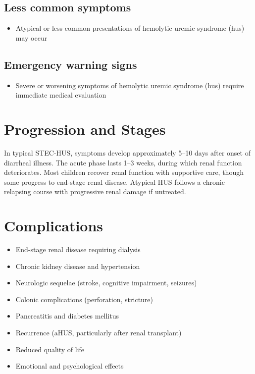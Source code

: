 \subsection{Less common symptoms}
\begin{itemize}[noitemsep]
  \item Atypical or less common presentations of hemolytic uremic syndrome (hus) may occur
\end{itemize}

\subsection{Emergency warning signs}
\begin{itemize}[noitemsep]
  \item Severe or worsening symptoms of hemolytic uremic syndrome (hus) require immediate medical evaluation
\end{itemize}
\section{Progression and Stages}
In typical STEC-HUS, symptoms develop approximately 5--10 days after onset of diarrheal illness. The acute phase lasts 1--3 weeks, during which renal function deteriorates. Most children recover renal function with supportive care, though some progress to end-stage renal disease. Atypical HUS follows a chronic relapsing course with progressive renal damage if untreated.

\section{Complications}

\begin{itemize}[noitemsep]
  \item End-stage renal disease requiring dialysis
  \item Chronic kidney disease and hypertension
  \item Neurologic sequelae (stroke, cognitive impairment, seizures)
  \item Colonic complications (perforation, stricture)
  \item Pancreatitis and diabetes mellitus
  \item Recurrence (aHUS, particularly after renal transplant)
  \item Reduced quality of life
  \item Emotional and psychological effects
\end{itemize}

